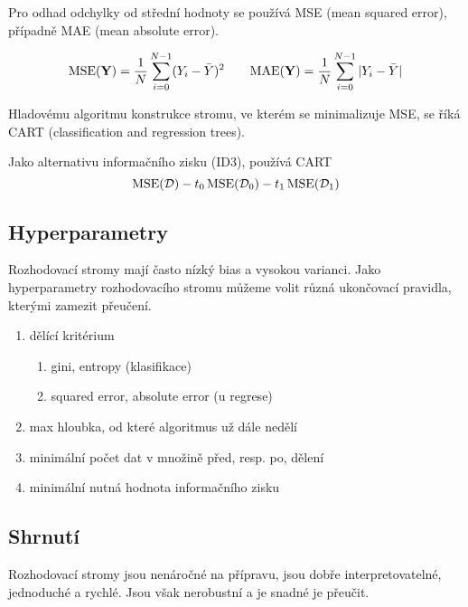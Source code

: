 \documentclass[../main.tex]{subfiles}
\begin{document}
Pro odhad odchylky od střední hodnoty se používá MSE (mean squared error), případně MAE (mean absolute error).

\begin{equation*}
    \begin{aligned}[t]
        \operatorname{MSE}(\mathbf{Y}) = \frac{1}{N} \sum_{i=0}^{N-1} (Y_i - \bar{Y})^2
    \end{aligned}
    \qquad
    \begin{aligned}[t]
        \operatorname{MAE}(\mathbf{Y}) = \frac{1}{N} \sum_{i=0}^{N-1} |Y_i - \bar{Y}|
    \end{aligned}
\end{equation*}

Hladovému algoritmu konstrukce stromu, ve kterém se minimalizuje MSE, se říká CART (classification and regression trees).

Jako alternativu informačního zisku (ID3), používá CART
\begin{equation*}
    \operatorname{MSE}(\mathcal{D}) - t_0 \operatorname{MSE}(\mathcal{D}_0) - t_1 \operatorname{MSE}(\mathcal{D}_1)
\end{equation*}

\subsection{Hyperparametry}

Rozhodovací stromy mají často nízký bias a vysokou varianci. Jako hyperparametry rozhodovacího stromu můžeme volit různá ukončovací pravidla, kterými zamezit přeučení.
\begin{enumerate}
    \item dělící kritérium
          \begin{enumerate}
              \item gini, entropy (klasifikace)
              \item squared error, absolute error (u regrese)
          \end{enumerate}
    \item max hloubka, od které algoritmus už dále nedělí
    \item minimální počet dat v množině před, resp. po, dělení
    \item minimální nutná hodnota informačního zisku
\end{enumerate}

\subsection{Shrnutí}

Rozhodovací stromy jsou nenáročné na přípravu, jsou dobře interpretovatelné, jednoduché a rychlé. Jsou však nerobustní a je snadné je přeučit.
\end{document}
